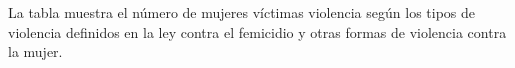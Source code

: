 La tabla muestra el número de mujeres víctimas violencia según los tipos de violencia definidos en la ley contra el femicidio y otras formas de violencia contra la mujer. 
